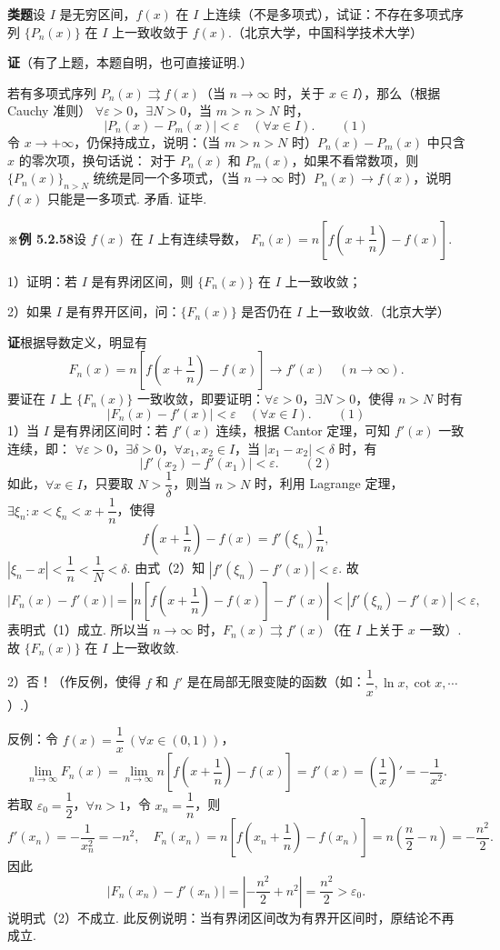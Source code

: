 \documentclass[UTF8, 12pt, fontset=fandol, oneside]{ctexart}
\begin{document}
\noindent\textbf{类题}\quad 设 $I$ 是无穷区间，$f(x)$ 在 $I$ 上连续（不是多项式），试证：不存在多项式序列
$\{P_n(x)\}$ 在 $I$ 上一致收敛于 $f(x)$.（北京大学，中国科学技术大学）

\noindent\textbf{证}\quad （有了上题，本题自明，也可直接证明.）

若有多项式序列 $P_n(x)\rightrightarrows f(x)$（当 $n\to\infty$ 时，关于 $x\in I$），那么（根据 Cauchy 准则）
$\forall\varepsilon>0$，$\exists N>0$，当 $m>n>N$ 时，
\[
  |P_n(x)-P_m(x)|<\varepsilon\quad(\forall x\in I).
\qquad(1)
\]
令 $x\to+\infty$，仍保持成立，说明：（当 $m>n>N$ 时）$P_n(x)-P_m(x)$ 中只含 $x$ 的零次项，换句话说：
对于 $P_n(x)$ 和 $P_m(x)$，如果不看常数项，则 $\{P_n(x)\}_{n>N}$ 统统是同一个多项式，（当
$n\to\infty$ 时）$P_n(x)\to f(x)$，说明 $f(x)$ 只能是一多项式. 矛盾. 证毕.

\noindent\textbf{※例 5.2.58}\quad 设 $f(x)$ 在 $I$ 上有连续导数，
$F_n(x)=n\left[f\left(x+\dfrac1n\right)-f(x)\right]$.

1）证明：若 $I$ 是有界闭区间，则 $\{F_n(x)\}$ 在 $I$ 上一致收敛；

2）如果 $I$ 是有界开区间，问：$\{F_n(x)\}$ 是否仍在 $I$ 上一致收敛.（北京大学）

\noindent\textbf{证}\quad 根据导数定义，明显有
\[
  F_n(x)=n\left[f\left(x+\frac1n\right)-f(x)\right]\to f'(x)\quad(n\to\infty).
\]
要证在 $I$ 上 $\{F_n(x)\}$ 一致收敛，即要证明：$\forall\varepsilon>0$，$\exists N>0$，使得 $n>N$ 时有
\[
  |F_n(x)-f'(x)|<\varepsilon\quad(\forall x\in I).
\qquad(1)
\]
1）当 $I$ 是有界闭区间时：若 $f'(x)$ 连续，根据 Cantor 定理，可知 $f'(x)$ 一致连续，即：
$\forall\varepsilon>0$，$\exists\delta>0$，$\forall x_1,x_2\in I$，当 $|x_1-x_2|<\delta$ 时，有
\[
  |f'(x_2)-f'(x_1)|<\varepsilon.
\qquad(2)
\]
如此，$\forall x\in I$，只要取 $N>\dfrac1\delta$，则当 $n>N$ 时，利用 Lagrange 定理，
$\exists\xi_n:x<\xi_n<x+\dfrac1n$，使得
\[
  f\left(x+\frac1n\right)-f(x)=f'(\xi_n)\frac1n,
\]
$|\xi_n-x|<\dfrac1n<\dfrac1N<\delta$. 由式（2）知 $|f'(\xi_n)-f'(x)|<\varepsilon$. 故
\[
  |F_n(x)-f'(x)|
  =\left|n\left[f\left(x+\frac1n\right)-f(x)\right]-f'(x)\right|
  <|f'(\xi_n)-f'(x)|<\varepsilon,
\]
表明式（1）成立. 所以当 $n\to\infty$ 时，$F_n(x)\rightrightarrows f'(x)$（在 $I$ 上关于 $x$ 一致）. 故
$\{F_n(x)\}$ 在 $I$ 上一致收敛.

2）否！（作反例，使得 $f$ 和 $f'$ 是在局部无限变陡的函数（如：$\dfrac1x,\ln x,\cot x,\cdots$）.）

反例：令 $f(x)=\dfrac1x\ (\forall x\in(0,1))$，
\[
  \lim_{n\to\infty}F_n(x)
  =\lim_{n\to\infty}n\left[f\left(x+\frac1n\right)-f(x)\right]
  =f'(x)=\left(\frac1x\right)'=-\frac1{x^2}.
\]
若取 $\varepsilon_0=\dfrac12$，$\forall n>1$，令 $x_n=\dfrac1n$，则
\[
  f'(x_n)=-\frac1{x_n^2}=-n^2,\quad
  F_n(x_n)=n\left[f\left(x_n+\frac1n\right)-f(x_n)\right]
  =n\left(\frac n2-n\right)=-\frac{n^2}{2}.
\]
因此
\[
  |F_n(x_n)-f'(x_n)|
  =\left|-\frac{n^2}{2}+n^2\right|
  =\frac{n^2}{2}>\varepsilon_0.
\]
说明式（2）不成立. 此反例说明：当有界闭区间改为有界开区间时，原结论不再成立.
\end{document}

